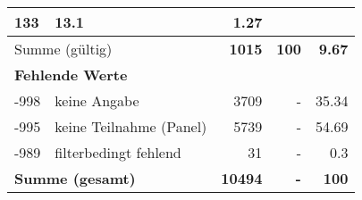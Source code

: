 \begin{longtable}{lXrrr}
       \num{133} &
       \num[round-mode=places,round-precision=2]{13.1} &
         \num[round-mode=places,round-precision=2]{1.27} \\
     \midrule
     \multicolumn{2}{l}{Summe (gültig)} &
       \textbf{\num{1015}} &
     \textbf{\num{100}} &
       \textbf{\num[round-mode=places,round-precision=2]{9.67}} \\
     \multicolumn{5}{l}{\textbf{Fehlende Werte}}\\
       -998 &
       keine Angabe &
         \num{3709} &
        - &
         \num[round-mode=places,round-precision=2]{35.34} \\
       -995 &
       keine Teilnahme (Panel) &
         \num{5739} &
        - &
         \num[round-mode=places,round-precision=2]{54.69} \\
       -989 &
       filterbedingt fehlend &
         \num{31} &
        - &
         \num[round-mode=places,round-precision=2]{0.3} \\
     \midrule
     \multicolumn{2}{l}{\textbf{Summe (gesamt)}} &
          \textbf{\num{10494}} &
        \textbf{-} &
        \textbf{\num{100}} \\
     \bottomrule
     \end{longtable}
     
